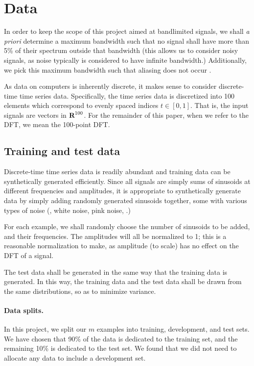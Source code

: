 \documentclass[12pt]{article}
\begin{document}
\section{Data}

In order to keep the scope of this project aimed at bandlimited signals, we shall \emph{a priori}
determine a maximum bandwidth such that no signal shall have more than 5\% of their spectrum outside
that bandwidth (this allows us to consider noisy signals, as noise typically is considered to have 
infinite bandwidth.) Additionally, we pick this maximum bandwidth such that aliasing does not 
occur \cite{OS:99}.

As data on computers is inherently discrete, it makes sense to consider discrete-time time series data.
Specifically, the time series data is discretized into 100 elements which correspond to evenly spaced 
indices $t \in [0,1]$. That is, the input signals are vectors in ${\mbox{\bf R}}^{100}$. For the remainder of
this paper, when we refer to the DFT, we mean the 100-point DFT. 


\subsection{Training and test data} Discrete-time time series data is readily abundant and 
training data can be synthetically generated efficiently. Since all signals are simply sums of 
sinusoids at different frequencies and amplitudes, it is appropriate to synthetically generate
data by simply adding randomly generated sinusoids together, some with various types of noise 
(\eg, white noise, pink noise, \etc.)

For each example, we shall randomly choose the number of sinusoids 
to be added, and their frequencies. The amplitudes will all be normalized to 1; this is a reasonable 
normalization to make, as amplitude (to scale) has no effect on the DFT of a signal.

The test data shall be generated in the same way that the training data is
generated. In this way, the training data and the test data shall be drawn from the same distributions,
so as to minimize variance.

\paragraph{Data splits.} In this project, we split our $m$ examples into training, development, and test
sets. We have chosen that 90\% of the data is dedicated to the training set, and the remaining 10\% is 
dedicated to the test set. We found that we did not need to allocate any data to include a development set.
\end{document}
